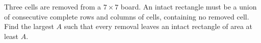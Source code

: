 Three cells are removed from a $7\times7$ board. An intact rectangle must be a union of consecutive complete rows and columns of cells, containing no removed cell. Find the largest $A$ such that every removal leaves an intact rectangle of area at least $A$.
